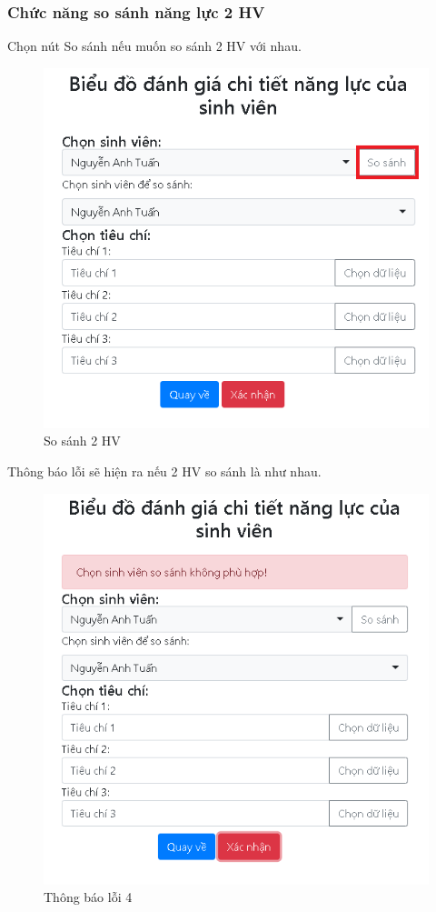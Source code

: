 \subsubsection*{Chức năng so sánh năng lực 2 HV}

Chọn nút So sánh nếu muốn so sánh 2 HV với nhau.

\begin{center}
	\begin{figure}[htp]
		\begin{center}
			\includegraphics[width=0.4\linewidth]{img/23}
		\end{center}
		\caption{So sánh 2 HV}
		\label{refhinh55}
	\end{figure}
\end{center}
\vskip 3cm

Thông báo lỗi sẽ hiện ra nếu 2 HV so sánh là như nhau.

\begin{center}
	\begin{figure}[htp]
		\begin{center}
			\includegraphics[width=0.5\linewidth]{img/24}
		\end{center}
		\caption{Thông báo lỗi 4}
		\label{refhinh56}
	\end{figure}
\end{center}

